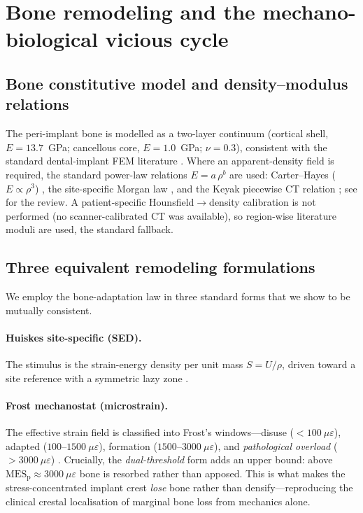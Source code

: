 
\section{Bone remodeling and the mechano-biological vicious cycle}
\label{sec:bone_remodeling}

\subsection{Bone constitutive model and density--modulus relations}
The peri-implant bone is modelled as a two-layer continuum (cortical shell, $E=13.7$~GPa; cancellous
core, $E=1.0$~GPa; $\nu=0.3$), consistent with the standard dental-implant FEM literature
\citep{GengTanLiu2001,Himmlova2004}. Where an apparent-density field is required, the standard
power-law relations $E=a\,\rho^{b}$ are used: Carter--Hayes ($E\propto\rho^{3}$) \citep{CarterHayes1977},
the site-specific Morgan law \citep{Morgan2003}, and the Keyak piecewise CT relation \citep{Keyak1998};
see \citet{Helgason2008} for the review. A patient-specific Hounsfield$\rightarrow$density calibration
is not performed (no scanner-calibrated CT was available), so region-wise literature moduli are used,
the standard fallback.

\subsection{Three equivalent remodeling formulations}
We employ the bone-adaptation law in three standard forms that we show to be mutually consistent.

\paragraph{Huiskes site-specific (SED).} The stimulus is the strain-energy density per unit mass
$S=U/\rho$, driven toward a site reference with a symmetric lazy zone \citep{Huiskes1987,Weinans1992}.

\paragraph{Frost mechanostat (microstrain).} The effective strain field is classified into Frost's
windows---disuse ($<\!100~\mu\varepsilon$), adapted ($100$--$1500~\mu\varepsilon$), formation
($1500$--$3000~\mu\varepsilon$), and \emph{pathological overload} ($>\!3000~\mu\varepsilon$)
\citep{Frost1987,Frost2003}. Crucially, the \emph{dual-threshold} form adds an upper bound: above
$\mathrm{MES_p}\!\approx\!3000~\mu\varepsilon$ bone is resorbed rather than apposed. This is what makes
the stress-concentrated implant crest \emph{lose} bone rather than densify---reproducing the clinical
crestal localisation of marginal bone loss \citep{Oh2002} from mechanics alone.

